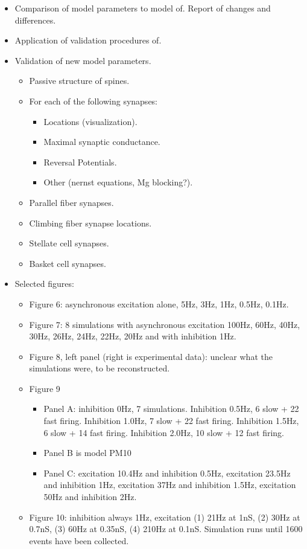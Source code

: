 \documentclass[12pt]{article}
\begin{document}
\begin{itemize}
  \begin{itemize}
  \item Comparison of model parameters to model
    of\cite{De-Schutter-E:1994vn}.  Report of changes and differences.
  \item Application of validation procedures
    of\cite{De-Schutter-E:1994vn}.
  \item Validation of new model parameters.
    \begin{itemize}
    \item Passive structure of spines.
    \item For each of the following synapses:
      \begin{itemize}
      \item Locations (visualization).
      \item Maximal synaptic conductance.
      \item Reversal Potentials.
      \item Other (nernst equations, Mg blocking?).
      \end{itemize}
    \item Parallel fiber synapses.
    \item Climbing fiber synapse locations.
    \item Stellate cell synapses.
    \item Basket cell synapses.
    \end{itemize}
  \item Selected figures:
    \begin{itemize}
    \item Figure 6: asynchronous excitation alone, 5Hz, 3Hz, 1Hz, 0.5Hz,
      0.1Hz.
    \item Figure 7: 8 simulations with asynchronous excitation 100Hz,
      60Hz, 40Hz, 30Hz, 26Hz, 24Hz, 22Hz, 20Hz and with inhibition 1Hz.
    \item Figure 8, left panel (right is experimental data): unclear
      what the simulations were, to be reconstructed.
    \item Figure 9
      \begin{itemize}
      \item Panel A: inhibition 0Hz, 7 simulations.  Inhibition 0.5Hz, 6
        slow + 22 fast firing.  Inhibition 1.0Hz, 7 slow + 22 fast
        firing.  Inhibition 1.5Hz, 6 slow + 14 fast firing.  Inhibition
        2.0Hz, 10 slow + 12 fast firing.
      \item Panel B is model PM10
      \item Panel C: excitation 10.4Hz and inhibition 0.5Hz, excitation
        23.5Hz and inhibition 1Hz, excitation 37Hz and inhibition 1.5Hz,
        excitation 50Hz and inhibition 2Hz.
      \end{itemize}
    \item Figure 10: inhibition always 1Hz, excitation (1) 21Hz at 1nS,
      (2) 30Hz at 0.7nS, (3) 60Hz at 0.35nS, (4) 210Hz at 0.1nS.
      Simulation runs until 1600 events have been collected.
    \end{itemize}
  \end{itemize}


\end{itemize}
\end{document}
